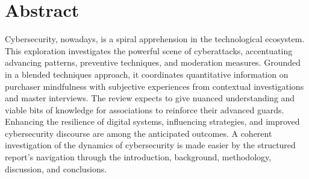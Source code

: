 \chapter*{\center \Large  Abstract}


Cybersecurity, nowadays, is a spiral apprehension in the technological ecosystem. This 
exploration investigates the powerful scene of cyberattacks, accentuating advancing patterns, 
preventive techniques, and moderation measures. Grounded in a blended techniques approach, it 
coordinates quantitative information on purchaser mindfulness with subjective experiences from 
contextual investigations and master interviews. The review expects to give nuanced 
understanding and viable bits of knowledge for associations to reinforce their advanced guards. 
Enhancing the resilience of digital systems, influencing strategies, and improved cybersecurity 
discourse are among the anticipated outcomes. A coherent investigation of the dynamics of 
cybersecurity is made easier by the structured report's navigation through the introduction, 
background, methodology, discussion, and conclusions.






